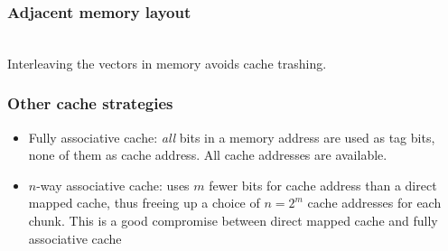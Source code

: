 \begin{frame}
  \frametitle{Adjacent memory layout}
  \begin{center}
     \\
    Interleaving the vectors in memory avoids cache trashing.
  \end{center}
\end{frame}

\begin{frame}
  \frametitle{Other cache strategies}
  \begin{itemize}
  \item Fully associative cache: \emph{all} bits in a memory address are used as
    tag bits, none of them as cache address. All cache addresses are available.
  \item $n$-way associative cache: uses $m$ fewer bits for cache address than a
    direct mapped cache, thus freeing up a choice of $n = 2^m$ cache addresses
    for each chunk. This is a good compromise between direct mapped cache and
    fully associative cache
  \end{itemize}
\end{frame}


